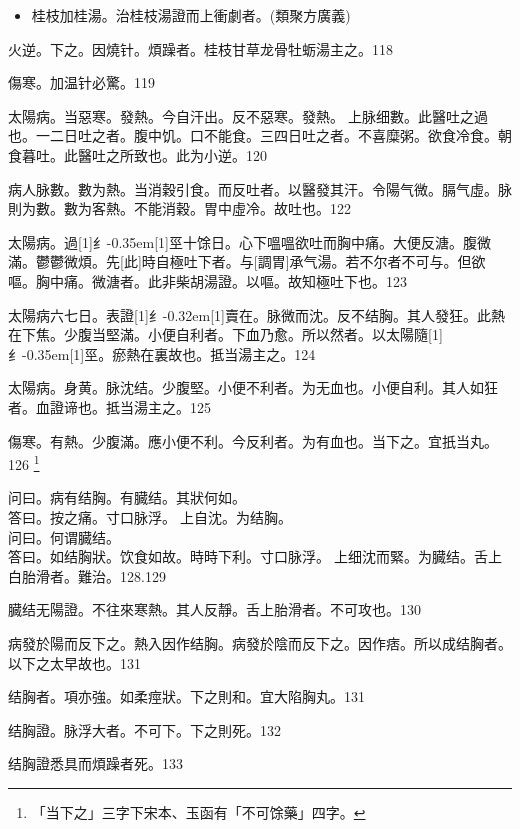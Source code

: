 \documentclass[11pt,oneside,b5paper]{ctexbook}
\begin{document}
\begin{flushleft}
\begin{itemize}
\item 桂枝加桂湯。治桂枝湯證而上衝劇者。(類聚方廣義)
\end{itemize}

火逆。下之。因燒针。煩躁者。桂枝甘草龙骨牡蛎湯主之。118

傷寒。加温针必驚。119

太陽病。当惡寒。發熱。今自汗出。反不惡寒。發熱。{𬮦}上脉细數。此醫吐之過也。一二日吐之者。腹中饥。口不能食。三四日吐之者。不喜糜粥。欲食冷食。朝食暮吐。此醫吐之所致也。此为小逆。120

病人脉數。數为熱。当消穀引食。而反吐者。以醫發其汗。令陽气微。膈气虛。脉則为數。數为客熱。不能消穀。胃中虛冷。故吐也。122

太陽病。過{\hbox{\scalebox{0.68}[1]{纟}\kern-0.35em\scalebox{0.64}[1]{巠}}}十馀日。心下嗢嗢欲吐而胸中痛。大便反溏。腹微滿。鬱鬱微煩。先[此]時自極吐下者。与[調胃]承气湯。若不尔者不可与。但欲嘔。胸中痛。微溏者。此非柴胡湯證。以嘔。故知極吐下也。123

太陽病六七日。表證{\hbox{\scalebox{0.6}[1]{纟}\kern-0.32em\scalebox{0.7}[1]{賣}}}在。脉微而沈。反不结胸。其人發狂。此熱在下焦。少腹当堅滿。小便自利者。下血乃愈。所以然者。以太陽隨{\hbox{\scalebox{0.68}[1]{纟}\kern-0.35em\scalebox{0.64}[1]{巠}}}。瘀熱在裏故也。抵当湯主之。124

太陽病。身黄。脉沈结。少腹堅。小便不利者。为无血也。小便自利。其人如狂者。血證谛也。抵当湯主之。125

傷寒。有熱。少腹滿。應小便不利。今反利者。为有血也。当下之。宜扺当丸。126
\footnote{「当下之」三字下宋本、玉函有「不可馀藥」四字。}

问曰。病有结胸。有臓结。其狀何如。\\
答曰。按之痛。寸口脉浮。{𬮦}上自沈。为结胸。\\
问曰。何谓臓结。\\
答曰。如结胸狀。饮食如故。時時下利。寸口脉浮。{𬮦}上细沈而緊。为臓结。舌上白胎滑者。難治。128.129

臓结无陽證。不往來寒熱。其人反靜。舌上胎滑者。不可攻也。130

病發於陽而反下之。熱入因作结胸。病發於陰而反下之。因作痞。所以成结胸者。以下之太早故也。131

结胸者。項亦強。如柔痙狀。下之則和。宜大陷胸丸。131

结胸證。脉浮大者。不可下。下之則死。132

结胸證悉具而煩躁者死。133


\end{flushleft}
\end{document}

